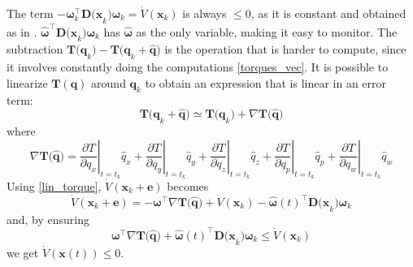 \documentclass{article}
\begin{document}
		The term $-\boldsymbol \omega_k^\top \mathbf{D(x}_k) \boldsymbol \omega_k = \dot V(\mathbf{x}_k)$ is always $\leq 0$, as it is constant and obtained as in \cite{lohmann_attitude}. $\hat{\boldsymbol \omega}^\top \mathbf{D(x}_k) \boldsymbol \omega_k$ has $\hat{\boldsymbol \omega}$ as the only variable, making it easy to monitor. The subtraction $\mathbf{T(q}_k) - \mathbf{T(q}_k + \mathbf{\hat{q}})$ is the operation that is harder to compute, since it involves constantly doing the computations \eqref{torques_vec}. It is possible to linearize $\mathbf{T(q)}$ around $\mathbf{q}_k$ to obtain an expression that is linear in an error term:
		\begin{equation}
			\mathbf{T(q}_k+\mathbf{\hat{q}}) \simeq \mathbf{T(q}_k) +  \nabla \mathbf{T(\hat{q}}) 
			\label{lin_torque} 
		\end{equation}
		where
		\[
			\displaystyle \nabla \mathbf{T(\hat{q}}) =\left .\displaystyle \frac{\partial T}{\partial q_x}\right |_{t=t_k}\hat{q}_x +
								\left .\displaystyle \frac{\partial T}{\partial q_y}\right |_{t=t_k}\hat{q}_y +
								\left .\displaystyle \frac{\partial T}{\partial q_z}\right |_{t=t_k}\hat{q}_z +
								\left .\displaystyle \frac{\partial T}{\partial q_p}\right |_{t=t_k}\hat{q}_p +
								\left .\displaystyle \frac{\partial T}{\partial q_w}\right |_{t=t_k}\hat{q}_w				
		\]
		Using \eqref{lin_torque}, $\dot V(\mathbf{x}_k + \mathbf{e})$ becomes
		\[
			\dot V(\mathbf{x}_k + \mathbf{e}) = -\boldsymbol \omega^\top  \nabla \mathbf{T(\hat{q}}) + \dot V(\mathbf{x}_k) - \hat{\boldsymbol \omega}(t)^\top \mathbf{D(x}_k) \boldsymbol \omega_k
		\]
		and, by ensuring
		\begin{equation}
			\boldsymbol \omega^\top  \nabla \mathbf{T(\hat{q}}) + \hat{\boldsymbol \omega}(t)^\top \mathbf{D(x}_k) \boldsymbol \omega_k \leq \dot V(\mathbf{x}_k) 
			\label{trigger}
		\end{equation}
		we get $\dot V(\mathbf{x}(t)) \leq 0$.
		
\end{document}
